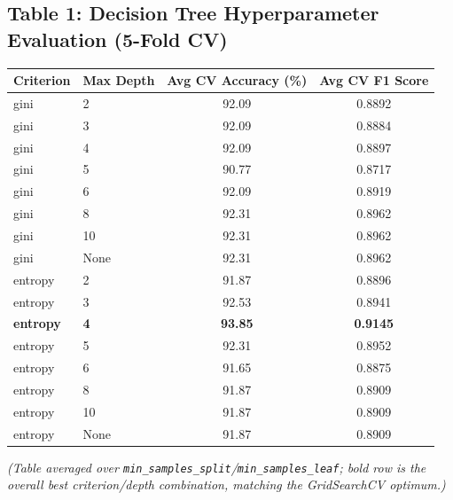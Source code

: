 \documentclass[12pt,a4paper]{article}
\begin{document}
\subsection*{Table 1: Decision Tree Hyperparameter Evaluation (5-Fold CV)}
\begin{longtable}{llcc}
\toprule
Criterion & Max Depth & Avg CV Accuracy (\%) & Avg CV F1 Score \\
\midrule
gini & 2 & 92.09 & 0.8892 \\
gini & 3 & 92.09 & 0.8884 \\
gini & 4 & 92.09 & 0.8897 \\
gini & 5 & 90.77 & 0.8717 \\
gini & 6 & 92.09 & 0.8919 \\
gini & 8 & 92.31 & 0.8962 \\
gini & 10 & 92.31 & 0.8962 \\
gini & None & 92.31 & 0.8962 \\
entropy & 2 & 91.87 & 0.8896 \\
entropy & 3 & 92.53 & 0.8941 \\
\textbf{entropy} & \textbf{4} & \textbf{93.85} & \textbf{0.9145} \\
entropy & 5 & 92.31 & 0.8952 \\
entropy & 6 & 91.65 & 0.8875 \\
entropy & 8 & 91.87 & 0.8909 \\
entropy & 10 & 91.87 & 0.8909 \\
entropy & None & 91.87 & 0.8909 \\
\bottomrule
\end{longtable}
\emph{(Table averaged over \texttt{min\_samples\_split}/\texttt{min\_samples\_leaf}; bold row is
the overall best criterion/depth combination, matching the GridSearchCV optimum.)}
\end{document}
